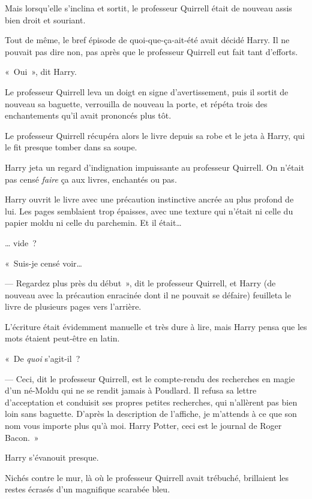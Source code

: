 Mais lorsqu'elle s'inclina et sortit, le professeur Quirrell était de nouveau assis bien droit et souriant.

Tout de même, le bref épisode de quoi-que-ça-ait-été avait décidé Harry. Il ne pouvait pas dire non, pas après que le professeur Quirrell eut fait tant d'efforts.

«~Oui~», dit Harry.

Le professeur Quirrell leva un doigt en signe d'avertissement, puis il sortit de nouveau sa baguette, verrouilla de nouveau la porte, et répéta trois des enchantements qu'il avait prononcés plus tôt.

Le professeur Quirrell récupéra alors le livre depuis sa robe et le jeta à Harry, qui le fit presque tomber dans sa soupe.

Harry jeta un regard d'indignation impuissante au professeur Quirrell. On n'était pas censé \emph{faire} ça aux livres, enchantés ou pas.

Harry ouvrit le livre avec une précaution instinctive ancrée au plus profond de lui. Les pages semblaient trop épaisses, avec une texture qui n'était ni celle du papier moldu ni celle du parchemin. Et il était…

… vide~?

«~Suis-je censé voir…

--- Regardez plus près du début~», dit le professeur Quirrell, et Harry (de nouveau avec la précaution enracinée dont il ne pouvait se défaire) feuilleta le livre de plusieurs pages vers l'arrière.

L'écriture était évidemment manuelle et très dure à lire, mais Harry pensa que les mots étaient peut-être en latin.

«~De \emph{quoi} s'agit-il~?

--- Ceci, dit le professeur Quirrell, est le compte-rendu des recherches en magie d'un né-Moldu qui ne se rendit jamais à Poudlard. Il refusa sa lettre d'acceptation et conduisit ses propres petites recherches, qui n'allèrent pas bien loin sans baguette. D'après la description de l'affiche, je m'attends à ce que son nom vous importe plus qu'à moi. Harry Potter, ceci est le journal de Roger Bacon.~»

Harry s'évanouit presque.

Nichés contre le mur, là où le professeur Quirrell avait trébuché, brillaient les restes écrasés d'un magnifique scarabée bleu.
